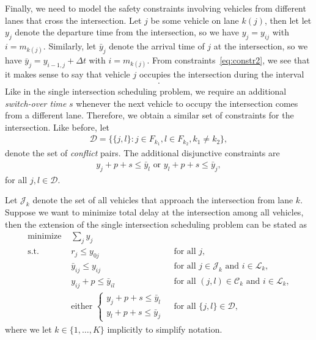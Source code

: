 \documentclass{article}
\theoremstyle{definition}
\theoremstyle{plain}
\begin{document}
Finally, we need to model the safety constraints involving vehicles from
different lanes that cross the intersection. Let $j$ be some vehicle on lane
$k(j)$, then let let $y_{j}$ denote the departure time from the intersection, so
we have $y_{j} = y_{ij}$ with $i=m_{k(j)}$. Similarly, let $\bar{y}_{j}$ denote
the arrival time of $j$ at the intersection, so we have
$\bar{y}_{j} = y_{i-1,j} + \Delta t$ with $i = m_{k(j)}$. From
constraints~\eqref{eq:constr2}, we see that it makes sense to say that vehicle
$j$ occupies the intersection during the interval
\begin{align}
  [\bar{y}_{ij}, y_{ij} + p] .
\end{align}
Like in the single intersection scheduling problem, we require an additional
\textit{switch-over time} $s$ whenever the next vehicle to occupy the
intersection comes from a different lane. Therefore, we obtain a similar set of
constraints for the intersection. Like before, let
\begin{align}
  \mathcal{D} = \{ \{j, l\} : j \in F_{k_{1}}, l \in F_{k_{2}} , k_{1} \neq k_{2} \} ,
\end{align}
denote the set of \textit{conflict} pairs. The additional disjunctive
constraints are
\begin{align}
  \label{eq:3}
  y_{j} + p + s \leq \bar{y}_{l} \text{ or } y_{l} + p + s \leq \bar{y}_{j} ,
\end{align}
for all $j, l \in \mathcal{D}$.

Let $\mathcal{J}_{k}$ denote the set of all vehicles that approach the
intersection from lane $k$. Suppose we want to minimize total delay at the
intersection among all vehicles, then the extension of the single intersection
scheduling problem can be stated as
\begin{subequations}
\begin{align}
  \label{eq:finite-buffer-problem}
  \text{minimize } & \sum_{j} y_{j} \\
  \text{s.t. } & r_{j} \leq y_{0j} & \text{ for all } j, \\
               & \bar{y}_{ij} \leq y_{ij} & \text{ for all } j \in \mathcal{J}_{k} \text{ and } i \in \mathcal{L}_{k}, \\
               & y_{ij} + p \leq \bar{y}_{il} & \text{ for all } (j,l) \in \mathcal{C}_{k} \text{ and } i \in \mathcal{L}_{k}, \\
               & \text{either } \begin{cases} y_{j} + p + s \leq \bar{y}_{l} \\ y_{l} + p + s \leq \bar{y}_{j} \end{cases} & \text{ for all } \{j,l\} \in \mathcal{D} ,
\end{align}
\end{subequations}
where we let $k \in \{1, \dots, K\}$ implicitly to simplify notation.
\end{document}
